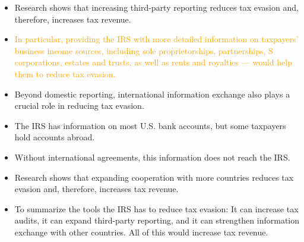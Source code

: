 \documentclass[11pt]{article}
\newcommand{\tk}[1]{\textcolor{orange}{#1}}
\begin{document}
\begin{itemize}
\item Research shows that increasing third-party reporting reduces tax evasion and, therefore, increases tax revenue.
\item \tk{In particular, providing the IRS with more detailed information on taxpayers’ business income sources, including sole proprietorships, partnerships, S corporations, estates and trusts, as well as rents and royalties — would help them to reduce tax evasion.}
\item Beyond domestic reporting, international information exchange also plays a crucial role in reducing tax evasion. 
\item The IRS has information on most U.S. bank accounts, but some taxpayers hold accounts abroad.
\item Without international agreements, this information does not reach the IRS.
\item Research shows that expanding cooperation with more countries reduces tax evasion and, therefore, increases tax revenue.
\item To summarize the tools the IRS has to reduce tax evasion: It can increase tax audits, it can expand third-party reporting, and it can strengthen information exchange with other countries. All of this would increase tax revenue. 
\end{itemize}
\end{document}
